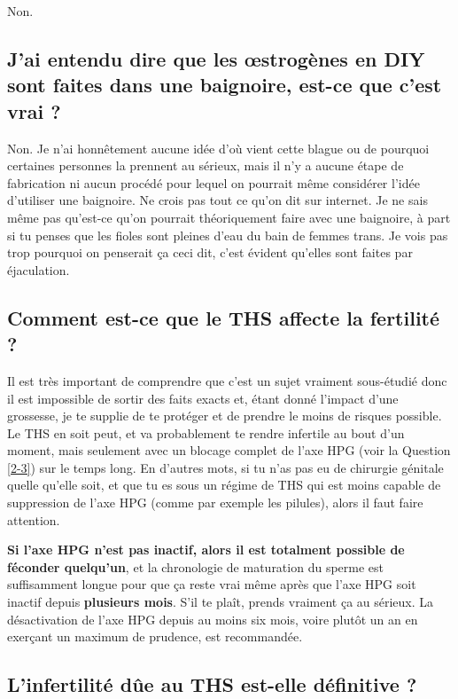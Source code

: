 \documentclass{article}
\begin{document}
Non.

\subsection{J'ai entendu dire que les œstrogènes en DIY sont faites dans une baignoire, est-ce que c'est vrai ?}

Non. Je n'ai honnêtement aucune idée d'où vient cette blague ou de pourquoi certaines personnes la prennent au sérieux, mais il n'y a aucune étape de fabrication ni aucun procédé pour lequel on pourrait même considérer l'idée d'utiliser une baignoire. Ne crois pas tout ce qu'on dit sur internet. Je ne sais même pas qu'est-ce qu'on pourrait théoriquement faire avec une baignoire, à part si tu penses que les fioles sont pleines d'eau du bain de femmes trans. Je vois pas trop pourquoi on penserait ça ceci dit, c'est évident qu'elles sont faites par éjaculation.

\subsection{Comment est-ce que le THS affecte la fertilité ?}\label{11-42}

Il est très important de comprendre que c'est un sujet vraiment sous-étudié donc il est impossible de sortir des faits exacts et, étant donné l'impact d'une grossesse, je te supplie de te protéger et de prendre le moins de risques possible. Le THS en soit peut, et va probablement te rendre infertile au bout d'un moment, mais seulement avec un blocage complet de l'axe HPG (voir la Question \ref{2-3}) sur le temps long. En d'autres mots, si tu n'as pas eu de chirurgie génitale quelle qu'elle soit, et que tu es sous un régime de THS qui est moins capable de suppression de l'axe HPG (comme par exemple les pilules), alors il faut faire attention.

\textbf{Si l'axe HPG n'est pas inactif, alors il est totalment possible de féconder quelqu'un}, et la chronologie de maturation du sperme est suffisamment longue pour que ça reste vrai même après que l'axe HPG soit inactif depuis \textbf{plusieurs mois}. S'il te plaît, prends vraiment ça au sérieux. La désactivation de l'axe HPG depuis au moins six mois, voire plutôt un an en exerçant un maximum de prudence, est recommandée. 

\subsection{L'infertilité dûe au THS est-elle définitive ?}\label{11-43}
\end{document}
